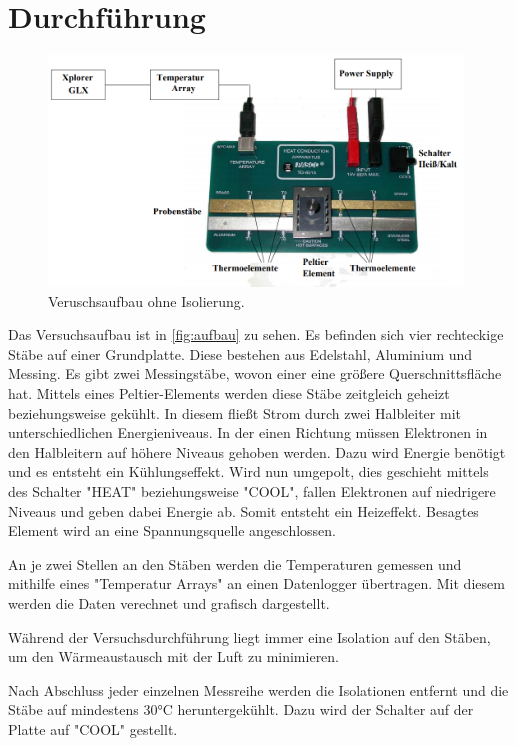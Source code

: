 \section{Durchführung}
\label{sec:Durchführung}

\begin{figure}
  \centering
  \includegraphics[width=0.98\textwidth]{content/aufbau.PNG}
  \caption{Veruschsaufbau ohne Isolierung.\cite[3]{v204}}
  \label{fig:aufbau}
\end{figure}

Das Versuchsaufbau ist in \autoref{fig:aufbau} zu sehen. Es befinden sich vier rechteckige Stäbe auf einer Grundplatte.
Diese bestehen aus Edelstahl, Aluminium und Messing. Es gibt zwei Messingstäbe, wovon einer eine größere Querschnittsfläche hat. 
Mittels eines Peltier-Elements werden diese Stäbe zeitgleich geheizt beziehungsweise gekühlt.
In diesem fließt Strom durch zwei Halbleiter mit unterschiedlichen Energieniveaus. In der einen Richtung müssen Elektronen in den Halbleitern auf höhere Niveaus gehoben werden. Dazu wird Energie benötigt und es entsteht ein Kühlungseffekt.
Wird nun umgepolt, dies geschieht mittels des Schalter "HEAT" beziehungsweise "COOL", fallen Elektronen auf niedrigere Niveaus und geben dabei Energie ab. Somit entsteht ein Heizeffekt.
Besagtes Element wird an eine Spannungsquelle angeschlossen.

An je zwei Stellen an den Stäben werden die Temperaturen gemessen und mithilfe eines "Temperatur Arrays" an einen Datenlogger übertragen.
Mit diesem werden die Daten verechnet und grafisch dargestellt.

Während der Versuchsdurchführung liegt immer eine Isolation auf den Stäben, um den Wärmeaustausch mit der Luft zu minimieren.

Nach Abschluss jeder einzelnen Messreihe werden die Isolationen entfernt und die Stäbe auf mindestens 30°C heruntergekühlt.
Dazu wird der Schalter auf der Platte auf "COOL" gestellt.

